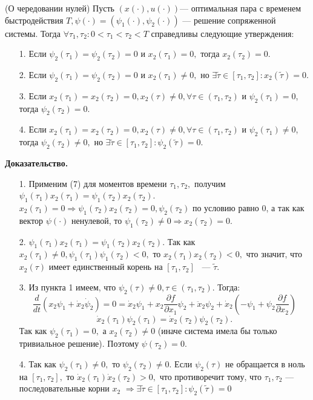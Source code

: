 \documentclass[11pt]{article}
\begin{document}
 
 	\begin{theorem}
 		{(О чередовании нулей) Пусть $(x(\cdot), u(\cdot))$--- оптимальная пара с временем быстродействия $T, \psi(\cdot)=(\psi_1(\cdot),\psi_2(\cdot))$ --- решение сопряженной системы. Тогда $\forall \tau_1, \tau_2: 0 < \tau_1 < \tau_2 < T$ справедливы следующие утверждения:}
 		\begin{itemize}
 			\item [1.]{Если $\psi_2(\tau_1)=\psi_2(\tau_2)=0$ и $x_2(\tau_1)=0,$ тогда $x_2(\tau_2)=0.$}
 			\item [2.]{Если $\psi_2(\tau_1)=\psi_2(\tau_2)=0$ и $x_2(\tau_1)\neq 0,$ но $\exists \tilde{\tau} \in [\tau_1, \tau_2]:x_2(\tilde{\tau})=0. $}
 			\item [3.]{Если $x_2(\tau_1) = x_2(\tau_2)=0, x_2(\tau) \neq 0, \forall \tau \in (\tau_1, \tau_2)$ и $\psi_2(\tau_1)=0$, тогда $\psi_2(\tau_2)=0.$}
 			\item [4.]{Если $x_2(\tau_1) = x_2(\tau_2)=0, x_2(\tau) \neq 0, \forall \tau \in (\tau_1, \tau_2)$ и $\psi_2(\tau_1)\neq0$, тогда $\psi_2(\tau_2)\neq0,$ но $\exists \tilde{\tau}\in [\tau_1, \tau_2]:\psi_2(\tilde{\tau})=0.$}
 		\end{itemize}
 	\end{theorem}
 	{\textbf{Доказательство.}}
 	\begin{itemize}
 		\item [1.]{Применим (7) для моментов времени $\tau_1,\tau_2,$ получим $\psi_1(\tau_1)x_2(\tau_1)=\psi_1(\tau_2)x_2(\tau_2).$ $x_2(\tau_1)=0 \Rightarrow \psi_1(\tau_2)x_2(\tau_2) = 0,\psi_2(\tau_2)$ по условию равно 0, а так как вектор $\psi(\cdot)$ ненулевой, то $\psi_1(\tau_2) \neq 0 \Rightarrow x_2(\tau_2) = 0.$}
 		\item [2.]{$\psi_1(\tau_1)x_2(\tau_1) = \psi_1(\tau_2)x_2(\tau_2).$ Так как $x_2(\tau_1) \neq 0, \psi_1(\tau_1)\psi_1(\tau_2) < 0,$ то $x_2(\tau_1)x_2(\tau_2) < 0,$ что значит, что $x_2(\tau)$ имеет единственный корень на $[\tau_1,\tau_2]$ ~--- $\tilde{\tau}.$} 
 		\item [3.]{Из пункта 1 имеем, что $\psi_2(\tau) \neq 0, \tau \in (\tau_1, \tau_2).$ Тогда: 
 		\begin{equation}
 			 \frac{d}{dt}(x_2\psi_1 + \dot{x}_2\dot{\psi}_2) = 0 = \dot{x}_2\psi_1 + x_2\frac{\partial f}{\partial x_1}\psi_2 + \ddot{x}_2\psi_2 + \dot{x}_2(-\psi_1 + \psi_2\frac{\partial f}{\partial x_2})
 		\end{equation}
 		\begin{equation}
 			\dot{x}_2(\tau_1)\psi_2(\tau_1) = \dot{x}_2(\tau_2)\psi_2(\tau_2).
 		\end{equation}
 		Так как $\psi_2(\tau_1) = 0,$ а $x_2(\tau_2) \neq 0$ (иначе система имела бы только тривиальное решение). Поэтому $\psi(\tau_2) = 0.$
 	 }
 		\item [4.]{Так как $\psi_2(\tau_1) \neq 0,$ то $\psi_2(\tau_2) \neq 0.$ Если $\psi_2(\tau)$ не обращается в ноль на $[\tau_1, \tau_2],$ то $\dot{x}_2(\tau_1)\dot{x}_2(\tau_2) > 0,$ что противоречит тому, что $\tau_1, \tau_2$ --- последовательные корни $x_2$ $\Rightarrow \exists \tilde{\tau} \in [\tau_1, \tau_2]:\psi_2(\tilde{\tau}) = 0$ }
 	\end{itemize}
 	
\end{document}
